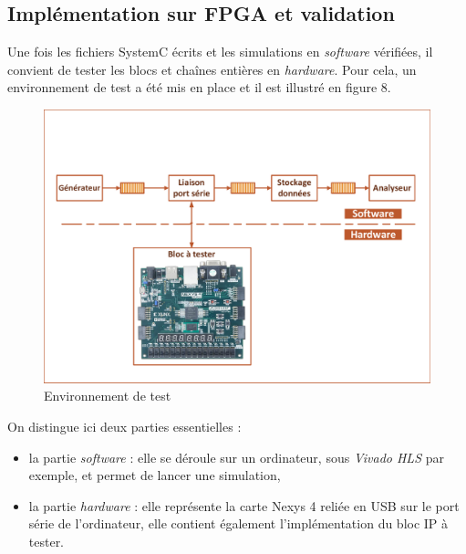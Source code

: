 \documentclass[a4paper,12pt]{article}
\begin{document}
\subsection{Implémentation sur FPGA et validation}
Une fois les fichiers SystemC écrits et les simulations en \textit{software} vérifiées, il convient de tester les blocs et chaînes entières en \textit{hardware}. Pour cela, un environnement de test a été mis en place et il est illustré en figure 8.
\begin{figure}[H]
\centering
\includegraphics[width=\textwidth, keepaspectratio]{Dessin6.pdf}
\caption{Environnement de test}
\end{figure}
\noindent On distingue ici deux parties essentielles :\\
\begin{itemize}
\item[\textbullet] la partie \textit{software} : elle se déroule sur un ordinateur, sous \textit{Vivado HLS} par exemple, et permet de lancer une simulation,\\
\item[\textbullet] la partie \textit{hardware} : elle représente la carte Nexys 4 reliée en USB sur le port série de l'ordinateur, elle contient également l'implémentation du bloc IP à tester.\\
\end{itemize} 
\end{document}
